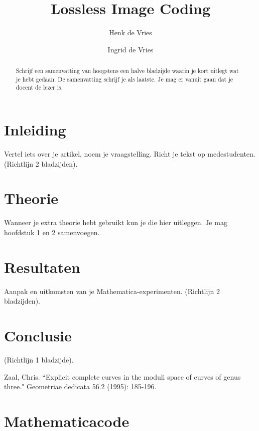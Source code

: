\documentclass[complatex]{uvamath}
\title{Lossless Image Coding}
\author[henk@science.uva.nl, 6127901]{Henk de Vries}
\author[ingrid@science.uva.nl, 6123102]{Ingrid de Vries}
\begin{document}
\maketitle

\begin{abstract}
Schrijf een samenvatting van hoogstens een halve bladzijde waarin je kort uitlegt wat je hebt gedaan. De samenvatting schrijf je als laatste. Je mag er vanuit gaan dat je docent de lezer is.
\end{abstract}

\tableofcontents

\chapter{Inleiding}
Vertel iets over je artikel, noem je vraagstelling. Richt je tekst op medestudenten. (Richtlijn 2 bladzijden).

\chapter{Theorie}
Wanneer je extra theorie hebt gebruikt kun je die hier uitleggen. Je mag hoofdstuk 1 en 2 samenvoegen.

\chapter{Resultaten}
Aanpak en uitkomsten van je Mathematica-experimenten. (Richtlijn 2 bladzijden).

\chapter{Conclusie}
(Richtlijn 1 bladzijde).

\clearpage%
\begin{thebibliography}{}
Zaal, Chris. ``Explicit complete curves in the moduli space of curves of genus three." Geometriae dedicata 56.2 (1995): 185-196.
\end{thebibliography}

\appendix

\chapter{Mathematicacode}
\end{document}
